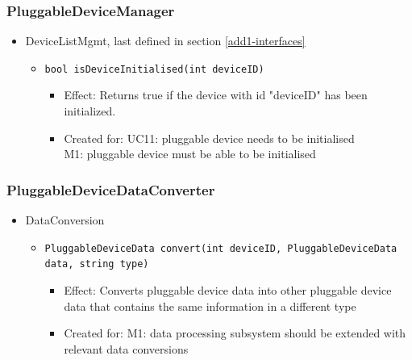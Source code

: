     \subsubsection{PluggableDeviceManager}
        \begin{itemize}
        	\item DeviceListMgmt, last defined in section \ref{add1-interfaces}
        	\begin{itemize}
        		\item \texttt{bool isDeviceInitialised(int deviceID)}
        		\begin{itemize}
        			\item Effect: Returns true if the device with id "deviceID" has been initialized.
                    \item Created for: UC11: pluggable device needs to be initialised \\
                          M1: pluggable device must be able to be initialised
        		\end{itemize}
        	\end{itemize}
        \end{itemize}


    \subsubsection{PluggableDeviceDataConverter}
    \begin{itemize}
        \item DataConversion
        \begin{itemize}
            \item \texttt{PluggableDeviceData convert(int deviceID, PluggableDeviceData data, string type)}
            \begin{itemize}
                \item Effect: Converts pluggable device data into other pluggable device
                      data that contains the same information in a different type
                \item Created for: M1: data processing subsystem should be
                      extended with relevant data conversions
            \end{itemize}
        \end{itemize}
    \end{itemize}

